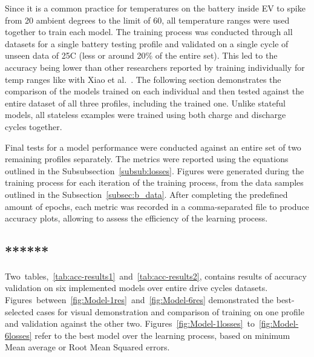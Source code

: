Since it is a common practice for temperatures on the battery inside EV to spike from 20 ambient degrees to the limit of 60, all temperature ranges were used together to train each model.
The training process was conducted through all datasets for a single battery testing profile and validated on a single cycle of unseen data of 25\textdegree{}C (less or around 20\% of the entire set).
This led to the accuracy being lower than other researchers reported by training individually for temp ranges like with Xiao et al.~\cite{xiao_accurate_2019}.
The following section demonstrates the comparison of the models trained on each individual and then tested against the entire dataset of all three profiles, including the trained one.
Unlike stateful models, all stateless examples were trained using both charge and discharge cycles together.

%
%
Final tests for a model performance were conducted against an entire set of two remaining profiles separately.
The metrics were reported using the equations outlined in the \mbox{Subsubsection~\ref{subsub:losses}}.
Figures were generated during the training process for each iteration of the training process, from the data samples outlined in the \mbox{Subsection~\ref{subsec:b_data}}.
After completing the predefined amount of epochs, each metric was recorded in a comma-separated file to produce accuracy plots, allowing to assess the efficiency of the learning process.

%
%
\subsection{******}
\mbox{Two tables, \ref{tab:acc-results1} and \ref{tab:acc-results2}}, contains results of accuracy validation on six implemented models over entire drive cycles datasets.
\mbox{Figures between \ref{fig:Model-1res} and \ref{fig:Model-6res}} demonstrated the best-selected cases for visual demonstration and comparison of training on one profile and validation against the other two.
\mbox{Figures \ref{fig:Model-1losses} to \ref{fig:Model-6losses}} refer to the best model over the learning process, based on minimum Mean average or Root Mean Squared errors.

